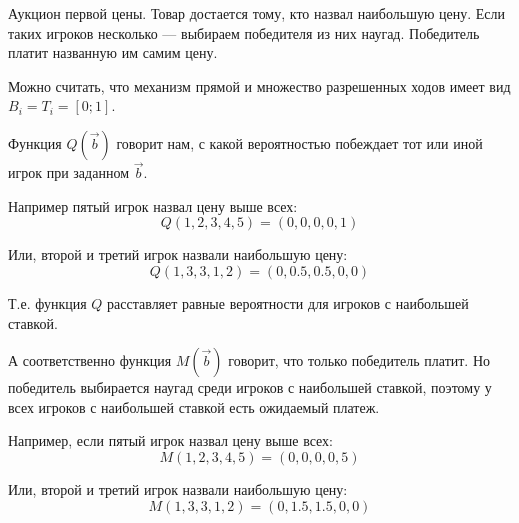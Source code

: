 \begin{myex} Аукцион первой цены. Товар достается тому, кто назвал наибольшую цену. Если таких игроков несколько --- выбираем победителя из них наугад. Победитель платит названную им самим цену. 

Можно считать, что механизм прямой и множество разрешенных ходов имеет вид $B_{i}=T_{i}=[0;1] $. 

Функция $ Q(\vec{b}) $ говорит нам, с какой вероятностью побеждает тот или иной игрок при заданном $ \vec{b} $. 

Например пятый игрок назвал цену выше всех:
\begin{equation}
Q(1,2,3,4,5)=(0,0,0,0,1)
\end{equation}

Или, второй и третий игрок назвали наибольшую цену:
\begin{equation}
Q(1,3,3,1,2)=(0,0.5,0.5,0,0)
\end{equation}

Т.е. функция $ Q $ расставляет равные вероятности для игроков с наибольшей ставкой.

А соответственно функция $ M(\vec{b}) $ говорит, что только победитель платит. Но победитель выбирается наугад среди игроков с наибольшей ставкой, поэтому у всех игроков с наибольшей ставкой есть ожидаемый платеж.

Например, если пятый игрок назвал цену выше всех:
\begin{equation}
M(1,2,3,4,5)=(0,0,0,0,5)
\end{equation}

Или, второй и третий игрок назвали наибольшую цену:
\begin{equation}
M(1,3,3,1,2)=(0,1.5,1.5,0,0)
\end{equation}






\end{myex}

